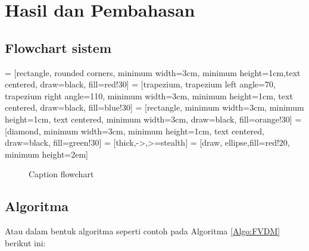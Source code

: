 \chapter{Hasil dan Pembahasan}
\section{Flowchart sistem}

 = [rectangle, rounded corners, minimum width=3cm, minimum height=1cm,text centered, draw=black, fill=red!30]
 = [trapezium, trapezium left angle=70, trapezium right angle=110, minimum width=3cm, minimum height=1cm, text centered, draw=black, fill=blue!30]
 = [rectangle, minimum width=3cm, minimum height=1cm, text centered, minimum width=3cm, draw=black, fill=orange!30]
 = [diamond, minimum width=3cm, minimum height=1cm, text centered, draw=black, fill=green!30]
 = [thick,->,>=stealth]
 = [draw, ellipse,fill=red!20,
    minimum height=2em]

\begin{figure}[h!]
    \centering
    \caption{Caption flowchart}
    \label{figflow}
\end{figure}

\section{Algoritma}
 Atau dalam bentuk algoritma seperti contoh pada Algoritma \ref{Algo:FVDM} berikut ini:
 

